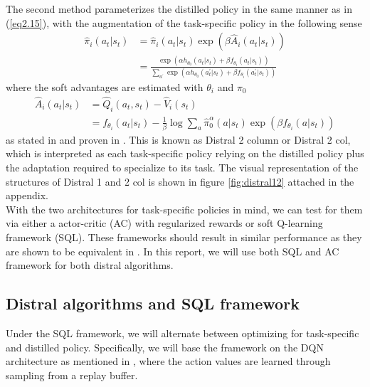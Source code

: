 \documentclass[12pt]{report}
\begin{document}
The second method parameterizes the distilled policy in the same manner as in (\ref{eq2.15}), with the augmentation of the task-specific policy in the following sense
\begin{align}
    \hat{\pi}_i(a_t|s_t) &= \hat{\pi}_i(a_t|s_t) \exp{(\beta\hat{A}_i(a_t|s_t))}\\
    &= \frac{\exp{(\alpha h_{\theta_0}(a_t|s_t) + \beta f_{\theta_i}(a_t|s_t))}}{\sum_{a^\prime}\exp{\left(\alpha h_{\theta_0}(a^\prime_t|s_t) + \beta f_{\theta_i}(a^\prime_t|s_t)\right)}} \label{eq:logit2}
\end{align}
where the soft advantages are estimated with $\theta_i$ and $\pi_0$
\begin{align}
    \hat{A}_i(a_t|s_t) &= \hat{Q}_i(a_t,s_t) - \hat{V}_i(s_t) \nonumber\\
    &= f_{\theta_i}(a_t|s_t) - \frac{1}{\beta}\log \sum_a \hat{\pi}_0^\alpha(a|s_t)\exp{(\beta f_{\theta_i}(a|s_t))} \label{eq:distral-SQL-V}
\end{align}
as stated in \cite{teh2017distral} and proven in \cite{rawlik2013stochastic} \cite{fox2015taming} \cite{nachum2017bridging}. This is known as Distral 2 column or Distral 2 col, which is interpreted as each task-specific policy relying on the distilled policy plus the adaptation required to specialize to its task. The visual representation of the structures of Distral 1 and 2 col is shown in figure \ref{fig:distral12} attached in the appendix.\\

With the two architectures for task-specific policies in mind, we can test for them via either a actor-critic (AC) with regularized rewards or soft Q-learning framework (SQL). These frameworks should result in similar performance as they are shown to be equivalent in \cite{schulman2017equivalence}. In this report, we will use both SQL and AC framework for both distral algorithms.

\subsection{Distral algorithms and SQL framework}


Under the SQL framework, we will alternate between optimizing for task-specific and distilled policy. Specifically, we will base the framework on the DQN architecture as mentioned in \cite{mnih2013playing} \cite{mnih2015human}, where the action values are learned through sampling from a replay buffer.\\
\end{document}
